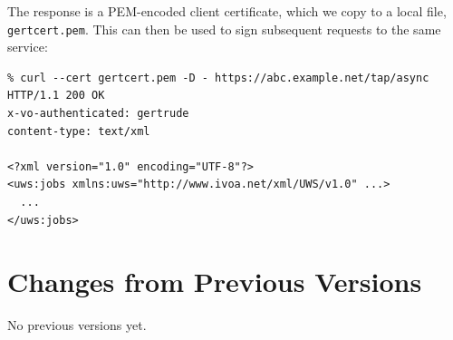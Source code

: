 \documentclass[11pt,a4paper]{ivoa}
\begin{document}
\noindent
The response is a PEM-encoded client certificate, which we copy
to a local file, \verb|gertcert.pem|.
This can then be used to sign subsequent requests to the same service:
{\footnotesize
\begin{verbatim}
% curl --cert gertcert.pem -D - https://abc.example.net/tap/async
HTTP/1.1 200 OK
x-vo-authenticated: gertrude
content-type: text/xml

<?xml version="1.0" encoding="UTF-8"?>
<uws:jobs xmlns:uws="http://www.ivoa.net/xml/UWS/v1.0" ...>
  ...
</uws:jobs>
\end{verbatim}
}



\appendix
\section{Changes from Previous Versions}

No previous versions yet.



\end{document}
